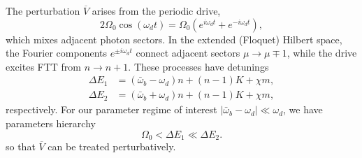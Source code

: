 The perturbation $\overline{V}$ arises from the periodic drive,
\begin{equation}
    2\Omega_0 \cos(\omega_d t)=\Omega_0\!\left(e^{i\omega_d t}+e^{-i\omega_d t}\right),
\end{equation}
which mixes adjacent photon sectors. In the extended (Floquet) Hilbert space, the Fourier components $e^{\pm i\omega_d t}$ connect adjacent sectors $\mu\to\mu\mp 1$, while the drive excites FTT from $n\to n+1$. These processes have detunings
\begin{align}
    \Delta E_1 &= (\bar{\omega}_b - \omega_d)n + (n-1)K + \chi m,\\
    \Delta E_2 &=(\bar{\omega}_b + \omega_d)n + (n-1)K + \chi m,
\end{align}
respectively.
For our parameter regime of interest $|\bar{\omega}_b - \omega_d|\ll\omega_d$, we have parameters hierarchy
\begin{equation}
\label{hierarchy}
    \Omega_0 < \Delta E_1 \ll \Delta E_2.
\end{equation}
so that $\overline{V}$ can be treated perturbatively.

